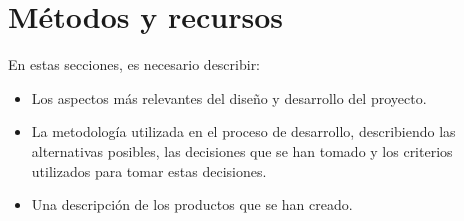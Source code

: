 \documentclass[12pt,a4paper,twoside,openany]{book}
\let\cleardoublepage\clearpage
\begin{document}
\setcounter{section}{0} %
\renewcommand{\thesection}{\arabic{section}} %


\hypersetup{pageanchor=true}


\newpage

\newpage

\pagestyle{fancy}
\renewcommand{\chaptermark}[1]{ \markboth{#1}{}}
\renewcommand{\sectionmark}[1]{\markright{ \thesection.\ #1}}
\lhead[\fancyplain{}{\bfseries\thepage}]{\fancyplain{}{\bfseries\rightmark}}
\rhead[\fancyplain{}{\bfseries\leftmark}]{\fancyplain{}{\bfseries\thepage}}
\cfoot{}

\cleardoublepage
{}
{}
\tableofcontents
\cleardoublepage
{}
{}
\listoffigures
\cleardoublepage
{}
{}
\listoftables

\thispagestyle{empty}


\pagestyle{fancy}
\renewcommand{\chaptermark}[1]{ \markboth{#1}{}}
\renewcommand{\sectionmark}[1]{\markright{ \thesection.\ #1}}
\lhead[\fancyplain{}{\bfseries\thepage}]{\fancyplain{}{\bfseries\rightmark}}
\rhead[\fancyplain{}{\bfseries\leftmark}]{\fancyplain{}{\bfseries\thepage}}
\cfoot{}

\onehalfspacing







\section{Métodos y recursos}

En estas secciones, es necesario describir:

\begin{itemize}
    \item Los aspectos más relevantes del diseño y desarrollo del proyecto.
    \item La metodología utilizada en el proceso de desarrollo, describiendo las alternativas posibles, las decisiones que se han tomado y los criterios utilizados para tomar estas decisiones.
    \item Una descripción de los productos que se han creado.
\end{itemize}
\end{document}
